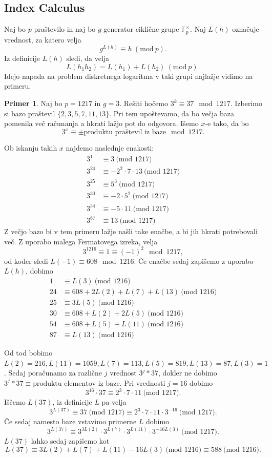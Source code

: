 \documentclass[12pt,a4paper,twoside]{article}
\theoremstyle{definition} %
\newtheorem{primer}[definicija]{Primer}
\theoremstyle{plain} %
\numberwithin{equation}{section}  %
\newcommand{\F}{\mathbb F}
\newcommand{\MOD}[1]{\ \text{(mod }{#1}\text{)}}
\begin{document}
\subsection{Index Calculus}
\label{IndexCalc}

Naj bo $p$ praštevilo in naj bo $g$ generator ciklične grupe $\F^{\times}_{p}$. Naj $L(h)$ označuje vrednost, za katero velja
$$g^{L(h)} \equiv h \ (\text{mod} \ p).$$
Iz definicije $L(h)$ sledi, da velja $$L(h_1h_2) = L(h_1)+L(h_2) \ (\text{mod} \ p).$$
Idejo napada na problem diskretnega logaritma v taki grupi najlažje vidimo na primeru.

\begin{primer}
Naj bo $p = 1217$ in $g= 3$. Rešiti hočemo $3^k \equiv 37 \mod 1217$. Izberimo si bazo praštevil $\{ 2,3,5,7,11,13 \}$. Pri tem upoštevamo, da bo večja baza pomenila več računanja a hkrati lažjo pot do odgovora. Išemo $x$-e  tako, da bo
$$3^x \equiv \pm \text{produktu praštevil iz baze} \mod 1217.$$

Ob iskanju takih $x$ najdemo naslednje enakosti:
\begin{align}
3^1 &\equiv 3 \MOD{1217} \nonumber \\ 
3^{24}  &\equiv -2^2\cdot 7\cdot 13 \MOD{1217} \nonumber \\
3^{25}  &\equiv 5^3 \MOD{1217} \nonumber \\
3^{30}  &\equiv -2 \cdot 5^2 \MOD{1217} \nonumber \\
3^{54}  &\equiv -5\cdot 11 \MOD{1217} \nonumber \\
3^{87}  &\equiv 13 \MOD{1217} \nonumber
\end{align}
Z večjo bazo bi v tem primeru lažje našli take enačbe, a bi jih hkrati potrebovali več.
Z uporabo malega Fermatovega izreka, velja
$$3^{1216} \equiv 1 \equiv (-1)^2 \mod 1217, $$
od koder sledi $L(-1) \equiv 608 \mod 1216$.
Če enačbe sedaj zapišemo z uporabo $L(h)$, dobimo
\begin{align}
1 &\equiv L(3) \MOD{1216} \nonumber \\ 
24&\equiv 608 + 2L(2) + L(7) +L(13) \MOD{1216} \nonumber \\
25 &\equiv 3L(5) \MOD{1216} \nonumber \\
30 &\equiv 608+L(2)+2L(5) \MOD{1216} \nonumber \\
54 &\equiv 608+L(5)+L(11) \MOD{1216} \nonumber \\
87  &\equiv L(13) \MOD{1216}  \nonumber
\end{align}

Od tod bobimo $L(2) = 216, L(11)=1059,L(7) = 113,L(5) = 819,L(13) = 87,L(3)=1$.
Sedaj poračunamo za različne $j$ vrednost $3^j*37$, dokler ne dobimo $3^j*37 \equiv \text{produktu elementov iz baze}$.
Pri vrednosti $j=16$ dobimo
$$3^{16}\cdot 37 \equiv 2^3\cdot 7 \cdot 11 \MOD{1217}.$$
Iščemo $L(37)$, iz definicije $L$ pa velja
$$3^{L(37)} \equiv 37 \MOD{1217} \equiv 2^3\cdot 7 \cdot 11 \cdot 3^{-16}\MOD{1217}.$$
Če sedaj namesto baze vstavimo primerne $L$ dobimo
$$3^{L(37)} \equiv 3^{3L(2)}\cdot 3^{L(7)} \cdot 3^{L(11)} \cdot 3^{-16L(3)}\MOD{1217}.$$
$L(37)$ lahko sedaj zapišemo kot
$$L(37) \equiv 3L(2) +L(7)+L(11) - 16L(3) \MOD{1216} \equiv 588 \MOD{1216}.$$


\end{primer}
\end{document}
